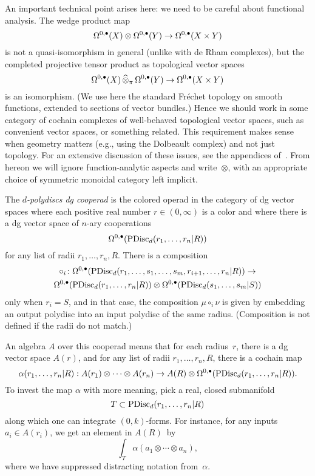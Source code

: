 \documentclass[11pt]{amsart}
\begin{document}
An important technical point arises here: 
we need to be careful about functional analysis.
The wedge product map
\[
\Omega^{0,\bullet}(X) \otimes \Omega^{0,\bullet}(Y) \to \Omega^{0,\bullet}(X \times Y)
\]
is not a quasi-isomorphism in general (unlike with de Rham complexes),
but the completed projective tensor product as topological vector spaces 
\[
\Omega^{0,\bullet}(X) \,\widehat{\otimes}_\pi\, \Omega^{0,\bullet}(Y) \to \Omega^{0,\bullet}(X \times Y)
\]
is an isomorphism.
(We use here the standard Fr\'echet topology on smooth functions, extended to sections of vector bundles.)
Hence we should work in some category of cochain complexes of well-behaved topological vector spaces, such as convenient vector spaces, or something related.
This requirement makes sense when geometry matters (e.g., using the Dolbeault complex) and not just topology.
For an extensive discussion of these issues, see the appendices of~\cite{CG1}.
From hereon we will ignore function-analytic aspects and write~$\otimes$,
with an appropriate choice of symmetric monoidal category left implicit.

\begin{dfn}
\label{dfn pdisc}
The {\em $d$-polydiscs dg cooperad} is the colored operad in the category of dg vector spaces where each positive real number $r \in (0,\infty)$ is a color 
and where there is a dg vector space of $n$-ary cooperations
\[
\Omega^{0,\bullet}({\rm PDisc}_d(r_1, \ldots, r_n| R)) 
\]
for any list of radii $r_1,\ldots, r_n, R$.
There is a composition
\begin{multline}
\circ_i \colon \Omega^{0,\bullet}({\rm PDisc}_d(r_1, \ldots, s_1, \ldots, s_m, r_{i+1}, \ldots, r_n| R)) \to \\ \Omega^{0,\bullet}({\rm PDisc}_d(r_1, \ldots, r_n| R)) \otimes \Omega^{0,\bullet}({\rm PDisc}_d(s_1, \ldots, s_m| S))
\end{multline}
only when $r_i = S$, 
and in that case, the composition $\mu \circ_i \nu$ is given by embedding an output polydisc into an input polydisc of the same radius.
(Composition is not defined if the radii do not match.)
\end{dfn}

An algebra $A$ over this cooperad means that for each radius~$r$, 
there is a dg vector space $A(r)$, and for any list of radii $r_1,\ldots, r_n, R$,
there is a cochain map
\[
\alpha(r_1, \ldots, r_n| R): A(r_1) \otimes \cdots \otimes A(r_n) \to A(R) \otimes \Omega^{0,\bullet}({\rm PDisc}_d(r_1, \ldots, r_n| R)) .
\]
To invest the map $\alpha$ with more meaning, 
pick a real, closed submanifold 
\[
T \subset {\rm PDisc}_d(r_1, \ldots, r_n| R)
\]
along which one can integrate $(0,k)$-forms.
For instance, for any inputs $a_i \in A(r_i)$, we get an element in $A(R)$~by
\[
\int_T \alpha(a_1 \otimes \cdots \otimes a_n),
\]
where we have suppressed distracting notation from~$\alpha$.
\end{document}
